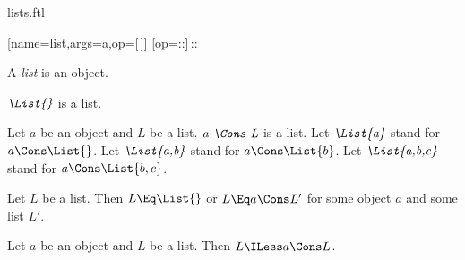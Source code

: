 \documentclass{stex}
\begin{document}
\begin{smodule}{lists.ftl}


[name=list,args=a,op=[\,]]{}
[op=::]{\,{::}\,}

\begin{signature*}[forthel,for=List]
  A \emph{list} is an object.
\end{signature*}

\begin{signature*}[forthel,for=List]
  $\emph{\List{}}$ is a list.
\end{signature*}

\begin{signature*}[forthel,for=List]
  Let $a$ be an object and $L$ be a list.
  $\emph{a \Cons L}$ is a list.
  Let $\emph{\List{a}}$ stand for $a \Cons \List{}$.
  Let $\emph{\List{a,b}}$ stand for $a \Cons \List{b}$.
  Let $\emph{\List{a,b,c}}$ stand for $a \Cons \List{b,c}$.
\end{signature*}

\begin{axiom*}[forthel,for=List]
  Let $L$ be a list.
  Then $L \Eq \List{}$ or $L \Eq a \Cons L'$ for some object $a$ and some list $L'$.
\end{axiom*}

\begin{axiom*}[forthel,for=List]
  Let $a$ be an object and $L$ be a list.
  Then $L \ILess a \Cons L$.
\end{axiom*}

\end{smodule}
\end{document}

